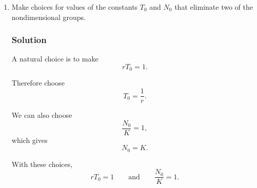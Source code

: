 \documentclass[12pt]{amsart}
\theoremstyle{conjecture}
\theoremstyle{definition}
\theoremstyle{question}
\theoremstyle{theorem}
\begin{document}
\begin{enumerate}[label=(\alph*)]
        \subsubsection*{Solution}

        From
        \[
            \frac{dx}{d\tau}
            =
            rT_0x
            \left(
                1-\frac{N_0}{K}x
            \right)
            -
            \frac{HT_0}{N_0},
        \]
        the nondimensional groups are
        \[
            rT_0,
            \qquad
            \frac{N_0}{K},
            \qquad
            \frac{HT_0}{N_0}.
        \]

        We may verify each directly.

        First,
        \[
            [rT_0]
            =
            T^{-1}T
            =
            1.
        \]

        Second,
        \[
            \left[\frac{N_0}{K}\right]
            =
            \frac{P}{P}
            =
            1.
        \]

        Third,
        \[
            \left[\frac{HT_0}{N_0}\right]
            =
            \frac{(P/T)T}{P}
            =
            1.
        \]

        Thus,
        \[
            \boxed{
                rT_0,\qquad
                \frac{N_0}{K},\qquad
                \frac{HT_0}{N_0}
            }
        \]
        are the nondimensional groups that arise.

        \item
        Make choices for values of the constants \(T_0\) and \(N_0\) that
        eliminate two of the nondimensional groups.

        \subsubsection*{Solution}

        A natural choice is to make
        \[
            rT_0=1.
        \]

        Therefore choose
        \[
            \boxed{T_0=\frac{1}{r}}.
        \]

        We can also choose
        \[
            \frac{N_0}{K}=1,
        \]
        which gives
        \[
            \boxed{N_0=K}.
        \]

        With these choices,
        \[
            rT_0=1
            \qquad\text{and}\qquad
            \frac{N_0}{K}=1.
        \]


\end{enumerate}
\end{document}
